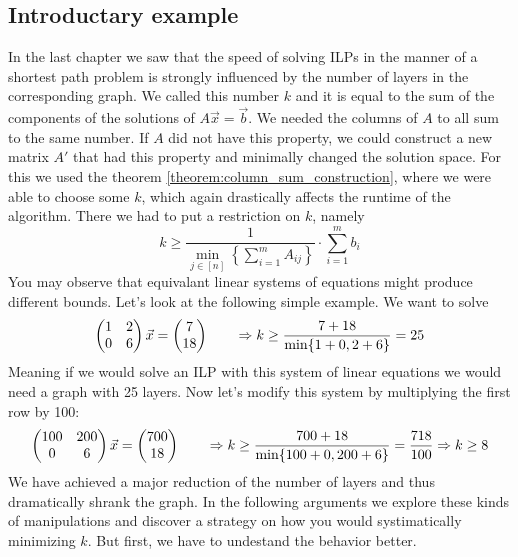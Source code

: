 \subsection{Introductary example}
In the last chapter we saw that the speed of solving ILPs in the manner of a shortest path problem is strongly influenced by the number of layers in the corresponding graph. We called this number $k$ and it is equal to the sum of the components of the solutions of $A\vec x=\vec b$. We needed the columns of $A$ to all sum to the same number. If $A$ did not have this property, we could construct a new matrix $A'$ that had this property and minimally changed the solution space. For this we used the theorem \ref{theorem:column_sum_construction}, where we were able to choose some $k$, which again drastically affects the runtime of the algorithm. There we had to put a restriction on $k$, namely
$$k \geq \frac{1}{\min_{j \in [n]} \left\{ \sum_{i=1}^{m}A_{ij}\right\}}\cdot \sum_{i=1}^{m}b_i$$
You may observe that equivalant linear systems of equations might produce different bounds. Let's look at the following simple example. We want to solve 
$$\left(\begin{matrix}1&2\\0&6\end{matrix}\right)\vec x = \left(\begin{matrix}7\\18\end{matrix}\right) \qquad \Rightarrow k \geq \frac{7 + 18}{\min\{1+0, 2+6\}} = 25$$
Meaning if we would solve an ILP with this system of linear equations we would need a graph with 25 layers. Now let's modify this system by multiplying the first row by 100:
$$\left(\begin{matrix}100&200\\0&6\end{matrix}\right)\vec x = \left(\begin{matrix}700\\18\end{matrix}\right) \qquad \Rightarrow k \geq \frac{700 + 18}{\min\{100+0, 200+6\}} = \frac{718}{100} \Rightarrow k \geq 8$$
We have achieved a major reduction of the number of layers and thus dramatically shrank the graph. In the following arguments we explore these kinds of manipulations and discover a strategy on how you would systimatically minimizing $k$. But first, we have to undestand the behavior better.

